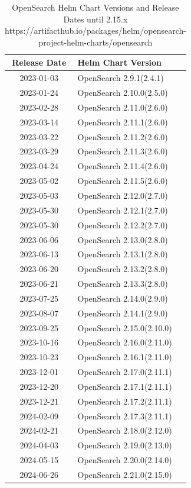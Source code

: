 \documentclass[../main.tex]{subfiles}
\begin{document}
\begin{table}[h]
\centering
\begin{tabular}{|c|l|}
\hline
\textbf{Release Date} & \textbf{Helm Chart Version} \\ \hline
    2023-01-03 & OpenSearch 2.9.1(2.4.1) \\ \hline
    2023-01-24 & OpenSearch 2.10.0(2.5.0) \\ \hline
    2023-02-28 & OpenSearch 2.11.0(2.6.0) \\ \hline  
    2023-03-14 & OpenSearch 2.11.1(2.6.0) \\ \hline 
    2023-03-22 & OpenSearch 2.11.2(2.6.0) \\ \hline 
    2023-03-29 & OpenSearch 2.11.3(2.6.0) \\ \hline  
    2023-04-24 & OpenSearch 2.11.4(2.6.0) \\ \hline
    2023-05-02 & OpenSearch 2.11.5(2.6.0) \\ \hline  
    2023-05-03 & OpenSearch 2.12.0(2.7.0) \\ \hline  
    2023-05-30 & OpenSearch 2.12.1(2.7.0) \\ \hline  
    2023-05-30 & OpenSearch 2.12.2(2.7.0) \\ \hline 
    2023-06-06 & OpenSearch 2.13.0(2.8.0) \\ \hline  
    2023-06-13 & OpenSearch 2.13.1(2.8.0) \\ \hline  
    2023-06-20 & OpenSearch 2.13.2(2.8.0) \\ \hline  
    2023-06-21 & OpenSearch 2.13.3(2.8.0) \\ \hline  
    2023-07-25 & OpenSearch 2.14.0(2.9.0) \\ \hline  
    2023-08-07 & OpenSearch 2.14.1(2.9.0) \\ \hline
    2023-09-25 & OpenSearch 2.15.0(2.10.0) \\ \hline  
    2023-10-16 & OpenSearch 2.16.0(2.11.0) \\ \hline 
    2023-10-23 & OpenSearch 2.16.1(2.11.0) \\ \hline  
    2023-12-01 & OpenSearch 2.17.0(2.11.1) \\ \hline  
    2023-12-20 & OpenSearch 2.17.1(2.11.1) \\ \hline  
    2023-12-21 & OpenSearch 2.17.2(2.11.1) \\ \hline 
    2024-02-09 & OpenSearch 2.17.3(2.11.1) \\ \hline 
    2024-02-21 & OpenSearch 2.18.0(2.12.0) \\ \hline  
    2024-04-03 & OpenSearch 2.19.0(2.13.0) \\ \hline  
    2024-05-15 & OpenSearch 2.20.0(2.14.0) \\ \hline  
    2024-06-26 & OpenSearch 2.21.0(2.15.0) \\ \hline  
\end{tabular}
\caption{OpenSearch Helm Chart Versions and Release Dates until 2.15.x https://artifacthub.io/packages/helm/opensearch-project-helm-charts/opensearch}
\label{table:opensearch_helm_versions}
\end{table}
\end{document}
